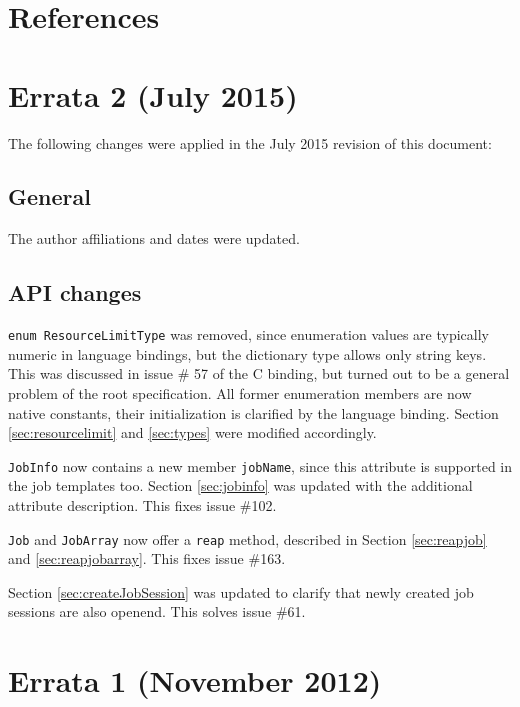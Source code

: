 \documentclass{article}
\newcommand{\h}[1]{\lstinline|#1|}
\begin{document}
\section{References}
\renewcommand{\refname}{}
\vspace*{-3em}


\newpage
\appendix

\section{Errata 2 (July 2015)}
\label{sec:errata}

The following changes were applied in the July 2015 revision of this document:

\subsection*{General}

The author affiliations and dates were updated.

\subsection*{API changes}

\lstinline{enum ResourceLimitType} was removed, since enumeration values are typically numeric in language bindings, but the dictionary type allows only string keys. This was discussed in issue \# 57 of the C binding, but turned out to be a general problem of the root specification. All former enumeration members are now native constants, their initialization is clarified by the language binding. Section \ref{sec:resourcelimit} and \ref{sec:types} were modified accordingly.

\h{JobInfo} now contains a new member \h{jobName}, since this attribute is supported in the job templates too. Section \ref{sec:jobinfo} was updated with the additional attribute description. This fixes issue \#102.

\h{Job} and \h{JobArray} now offer a \h{reap} method, described in Section \ref{sec:reapjob} and \ref{sec:reapjobarray}. This fixes issue \#163.

Section \ref{sec:createJobSession} was updated to clarify that newly created job sessions are also openend. This solves issue \#61.

\section{Errata 1 (November 2012)}
\end{document}
